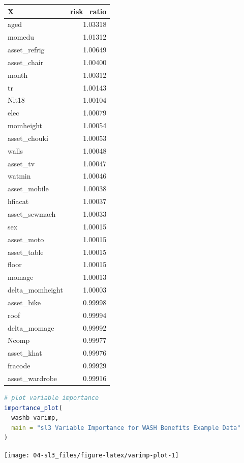 \documentclass[
  12pt, krantz2,
]{book}
\theoremstyle{definition}
\theoremstyle{definition}
\theoremstyle{definition}
\newcommand{\1}{\mathbbm{1}}
\begin{document}
\begin{tabular}{l|r}
\hline
X & risk\_ratio\\
\hline
aged & 1.03318\\
\hline
momedu & 1.01312\\
\hline
asset\_refrig & 1.00649\\
\hline
asset\_chair & 1.00400\\
\hline
month & 1.00312\\
\hline
tr & 1.00143\\
\hline
Nlt18 & 1.00104\\
\hline
elec & 1.00079\\
\hline
momheight & 1.00054\\
\hline
asset\_chouki & 1.00053\\
\hline
walls & 1.00048\\
\hline
asset\_tv & 1.00047\\
\hline
watmin & 1.00046\\
\hline
asset\_mobile & 1.00038\\
\hline
hfiacat & 1.00037\\
\hline
asset\_sewmach & 1.00033\\
\hline
sex & 1.00015\\
\hline
asset\_moto & 1.00015\\
\hline
asset\_table & 1.00015\\
\hline
floor & 1.00015\\
\hline
momage & 1.00013\\
\hline
delta\_momheight & 1.00003\\
\hline
asset\_bike & 0.99998\\
\hline
roof & 0.99994\\
\hline
delta\_momage & 0.99992\\
\hline
Ncomp & 0.99977\\
\hline
asset\_khat & 0.99976\\
\hline
fracode & 0.99929\\
\hline
asset\_wardrobe & 0.99916\\
\hline
\end{tabular}

\begin{lstlisting}[language=R]
# plot variable importance
importance_plot(
  washb_varimp,
  main = "sl3 Variable Importance for WASH Benefits Example Data"
)
\end{lstlisting}

\begin{center}\texttt{[image: 04-sl3\_files/figure-latex/varimp-plot-1]} \end{center}
\end{document}
